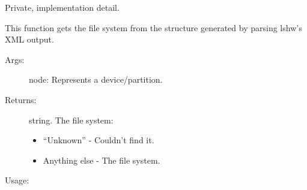 \documentclass[letterpaper,10pt,english]{sphinxmanual}
\begin{document}
\begin{fulllineitems}
\label{\detokenize{linux:getdevinfo.linux.get_file_system}}
Private, implementation detail.

This function gets the file system from the structure
generated by parsing lshw’s XML output.
\begin{description}
\item[{Args:}] \leavevmode
node:   Represents a device/partition.

\item[{Returns:}] \leavevmode
string. The file system:
\begin{itemize}
\item {} 
“Unknown”     - Couldn’t find it.

\item {} 
Anything else - The file system.

\end{itemize}

\end{description}

Usage:

\begin{sphinxVerbatim}[commandchars=\\\{\}]
  
\end{sphinxVerbatim}

\end{fulllineitems}

\end{document}
